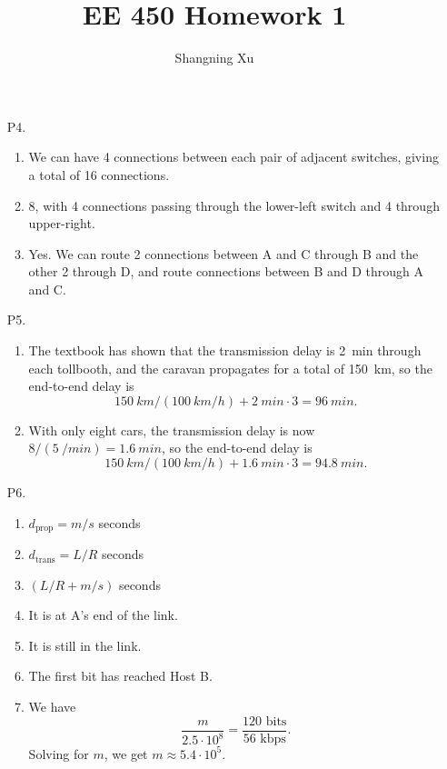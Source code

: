 \documentclass{article}
\title{EE 450 Homework 1}
\author{Shangning Xu}
\begin{document}
\maketitle

\begin{enumerate}
    \item[P4.] \begin{enumerate}
        \item We can have 4 connections between each pair of adjacent switches, giving a total of 16 connections.
        \item 8, with 4 connections passing through the lower-left switch and 4 through upper-right.
        \item Yes. We can route 2 connections between A and C through B and the other 2 through D, and route connections between B and D through A and C.
    \end{enumerate}

    \item[P5.] \begin{enumerate}
        \item The textbook has shown that the transmission delay is \SI{2}{min} through each tollbooth, and the caravan propagates for a total of \SI{150}{km}, so the end-to-end delay is
        \[
            \SI{150}{km} / (\SI{100}{km/h}) + \SI{2}{min} \cdot 3 = \SI{96}{min}.
        \]
        \item With only eight cars, the transmission delay is now $8 / (\SI{5}{/min}) = \SI{1.6}{min}$, so the end-to-end delay is
        \[
            \SI{150}{km} / (\SI{100}{km/h}) + \SI{1.6}{min} \cdot 3 = \SI{94.8}{min}.
        \]
    \end{enumerate}

    \item[P6.] \begin{enumerate}
        \item $d_\textrm{prop} = m/s$ seconds
        \item $d_\textrm{trans} = L/R$ seconds
        \item $(L/R + m/s)$ seconds
        \item It is at A's end of the link.
        \item It is still in the link.
        \item The first bit has reached Host B.
        \item We have
        \[
            \frac{m}{2.5 \cdot 10^8} = \frac{120\textrm{ bits}}{56\textrm{ kbps}}.
        \]
        Solving for $m$, we get $m \approx 5.4 \cdot 10^5$.
    \end{enumerate}


\end{enumerate}
\end{document}
